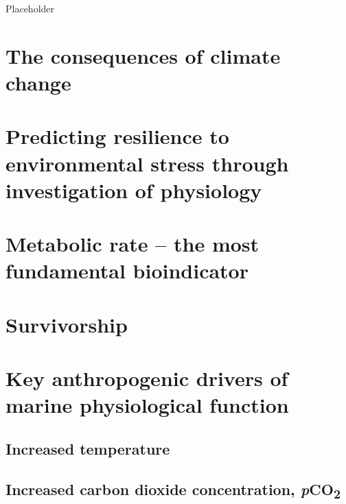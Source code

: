 \documentclass[
  oneside, 11pt, a4paper]{memoir}
\begin{document}
Placeholder

\hypertarget{the-consequences-of-climate-change}{%
\section{The consequences of climate change}\label{the-consequences-of-climate-change}}

\hypertarget{predicting-resilience-to-environmental-stress-through-investigation-of-physiology}{%
\section{Predicting resilience to environmental stress through investigation of physiology}\label{predicting-resilience-to-environmental-stress-through-investigation-of-physiology}}

\hypertarget{metabolic-rate-the-most-fundamental-bioindicator}{%
\section{Metabolic rate -- the most fundamental bioindicator}\label{metabolic-rate-the-most-fundamental-bioindicator}}

\hypertarget{survivorship}{%
\section{Survivorship}\label{survivorship}}

\hypertarget{key-anthropogenic-drivers-of-marine-physiological-function}{%
\section{Key anthropogenic drivers of marine physiological function}\label{key-anthropogenic-drivers-of-marine-physiological-function}}

\hypertarget{increased-temperature}{%
\subsection{Increased temperature}\label{increased-temperature}}

\hypertarget{increased-carbon-dioxide-concentration-pco2}{%
\subsection{\texorpdfstring{Increased carbon dioxide concentration, \emph{p}CO\textsubscript{2}}{Increased carbon dioxide concentration, pCO2}}\label{increased-carbon-dioxide-concentration-pco2}}
\end{document}
